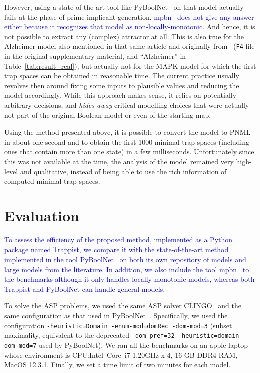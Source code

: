 \documentclass[runningheads]{llncs}
\newcommand{\revise}[1]{\textcolor{blue}{#1}}
\begin{document}
However, using a state-of-the-art tool like PyBoolNet~\cite{klarner2015computing} on that model actually fails at the phase of prime-implicant generation.
\revise{mpbn~\cite{Paulev2020} does not give any answer either because it recognizes that model as non-locally-monotonic.}
And hence, it is not possible to extract any (complex) attractor at all.
This is also true for the Alzheimer model also mentioned in that same article and originally from~\cite{ogishima2016alzpathway} (\verb|F4| file in the original supplementary material, and ``Alzheimer'' in Table~\ref{tab:result_real}), but actually not for the MAPK model for which the first trap spaces can be obtained in reasonable time.
The current practice usually revolves then around fixing some inputs to plausible values and reducing the model accordingly.
While this approach makes sense, it relies on potentially arbitrary decisions, and \emph{hides away} critical modelling choices that were actually not part of the original Boolean model or even of the starting map.

Using the method presented above, it is possible to convert the model to PNML in about one second and to obtain the first 1000 minimal trap spaces (including ones that contain more than one state) in a few milliseconds.
Unfortunately since this was not available at the time, the analysis of the model remained very high-level and qualitative, instead of being able to use the rich information of computed minimal trap spaces.

\section{Evaluation}%
\label{sec:eval}

\revise{To assess the efficiency of the proposed method, implemented as a Python package named Trappist, we compare it with the state-of-the-art method implemented in the tool PyBoolNet~\cite{klarner2015computing,klarner2017pyboolnet} on both its own repository of models and large models from the literature.
In addition, we also include the tool mpbn~\cite{Paulev2020} to the benchmarks although it only handles locally-monotonic models, whereas both Trappist and PyBoolNet can handle general models.
}

To solve the ASP problems, we used the same ASP solver CLINGO~\cite{DBLP:journals/aicom/GebserKKOSS11} and the same configuration as that used in PyBoolNet~\cite{klarner2015computing,klarner2017pyboolnet}.
Specifically, we used the configuration \texttt{-heuristic=Domain -enum-mod=domRec -dom-mod=3} (subset maximality, equivalent to the deprecated \texttt{--dom-pref=32 --heuristic=domain --dom-mod=7} used by PyBoolNet). We ran all the benchmarks on an apple laptop whose environment is CPU:\@ Intel\textregistered\ Core\texttrademark\ i7 1.20GHz x 4, 16 GB DDR4 RAM, MacOS 12.3.1. Finally, we set a time limit of two minutes for each model.
\end{document}
